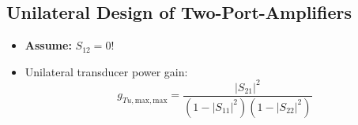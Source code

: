 \subsection{Unilateral Design of Two-Port-Amplifiers}
\begin{itemize}
    \item \textbf{Assume:} $S_{12} = 0$!
    \item Unilateral transducer power gain:
        \begin{equation*}
            g_{Tu,\mathrm{max},\mathrm{max}} = \frac{|S_{21}|^2}{(1 - |S_{11}|^2)(1 - |S_{22}|^2)}
        \end{equation*}
\end{itemize}
